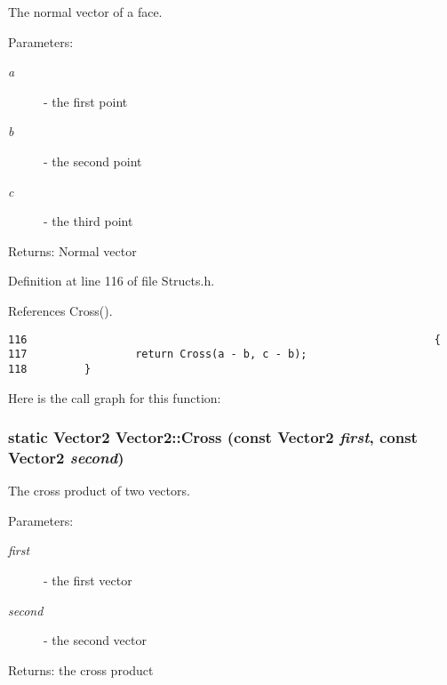 The normal vector of a face. 

\begin{Desc}
\item[Parameters:]
\begin{description}
\item[{\em a}]- the first point \item[{\em b}]- the second point \item[{\em c}]- the third point \end{description}
\end{Desc}
\begin{Desc}
\item[Returns:]Normal vector \end{Desc}


Definition at line 116 of file Structs.h.

References Cross().

\begin{Code}\begin{verbatim}116                                                                {
117                 return Cross(a - b, c - b);
118         }
\end{verbatim}
\end{Code}




Here is the call graph for this function:\hypertarget{struct_vector2_841ba377f4b9e2765aadca82d4577261}{
\subsubsection[Cross]{\setlength{\rightskip}{0pt plus 5cm}static {\bf Vector2} Vector2::Cross (const {\bf Vector2} {\em first}, \/  const {\bf Vector2} {\em second})}}
\label{struct_vector2_841ba377f4b9e2765aadca82d4577261}


The cross product of two vectors. 

\begin{Desc}
\item[Parameters:]
\begin{description}
\item[{\em first}]- the first vector \item[{\em second}]- the second vector \end{description}
\end{Desc}
\begin{Desc}
\item[Returns:]the cross product \end{Desc}



